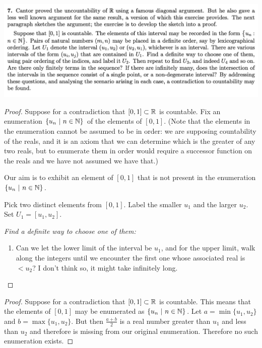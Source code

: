\includegraphics[width=400pt]{img/analysis--berkeley-202a--homework-1-a577.png}

\begin{proof}
  Suppose for a contradiction that $[0, 1] \subset \mathbb{R}$ is countable. Fix an enumeration $\{u_n ~|~ n \in \mathbb{N}\}$
  of the elements of $[0, 1]$. (Note that the elements in the enumeration cannot be assumed to be in order: we
  are supposing countability of the reals, and it is an axiom that we can determine which is the greater of any
  two reals, but to enumerate them in order would require a successor function on the reals and we have not
  assumed we have that.)

  Our aim is to exhibit an element of $[0, 1]$ that is not present in the enumeration$\{u_n ~|~ n \in \mathbb{N}\}$.

  Pick two distinct elements from $[0, 1]$. Label the smaller $u_1$ and the larger $u_2$. Set $U_1 = [u_1, u_2]$.

  {\it Find a definite way to choose one of them:}
  \begin{enumerate}
  \item Can we let the lower limit of the interval be $u_1$, and for the upper limit, walk along the integers until
    we encounter the first one whose associated real is $< u_2$? I don't think so, it might take infinitely long.
  \end{enumerate}



\end{proof}


\begin{proof}
  Suppose for a contradiction that $[0, 1] \subset \mathbb{R}$ is countable. This means that the elements of $[0, 1]$
  may be enumerated as $\{u_n ~|~ n \in \mathbb{N}\}$. Let $a = \min\{u_1, u_2\}$ and $b = \max\{u_1, u_2\}$. But
  then $\frac{a + b}{2}$ is a real number greater than $u_1$ and less than $u_2$ and therefore is missing from
  our original enumeration. Therefore no such enumeration exists.


\end{proof}




